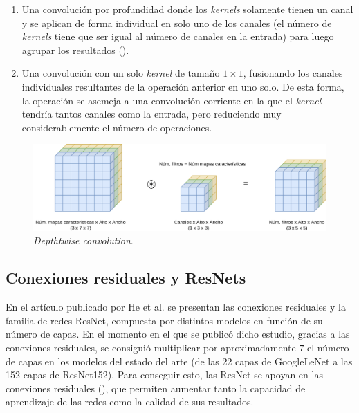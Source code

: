 \begin{itemize}
\begin{enumerate}
\item Una convolución por profundidad donde los \textit{kernels} solamente tienen un canal y se aplican de forma individual en solo uno de los canales (el número de \textit{kernels} tiene que ser igual al número de canales en la entrada) para luego agrupar los resultados ().
\item Una convolución con un solo \textit{kernel} de tamaño $1\times1$, fusionando los canales individuales resultantes de la operación anterior en uno solo. De esta forma, la operación se asemeja a una convolución corriente en la que el \textit{kernel} tendría tantos canales como la entrada, pero reduciendo muy considerablemente el número de operaciones.
\end{enumerate}

\begin{figure}[H]
\centering
\includegraphics[width=0.9\linewidth]{imagenes/convolucion-depthwise.png} 
\captionsetup{width=.9\linewidth}
\caption{\textit{Depthtwise convolution}.}
\label{fig:convolucion-depthwise}
\end{figure}

\end{itemize}

\subsection{Conexiones residuales y ResNets}\label{resnet}

En el artículo publicado por He et al. \cite{resnet} se presentan las conexiones residuales y la familia de redes ResNet, compuesta por distintos modelos en función de su número de capas. En el momento en el que se publicó dicho estudio, gracias a las conexiones residuales, se consiguió multiplicar por aproximadamente $7$ el número de capas en los modelos del estado del arte (de las 22 capas de GoogleLeNet \cite{googlelenet} a las 152 capas de ResNet152). Para conseguir esto, las ResNet se apoyan en las conexiones residuales (), que permiten aumentar tanto la capacidad de aprendizaje de las redes como la calidad de sus resultados.

